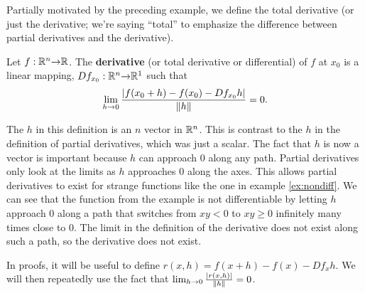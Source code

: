 Partially motivated by the preceding example, we define the
total derivative (or just the derivative; we're saying ``total'' to
emphasize the difference between partial derivatives and the
derivative).
\begin{definition}
  Let $f: \mathbb{R}^n {\rightarrow} \mathbb{R}$. The \textbf{derivative} (or total derivative
  or differential) of $f$ at $x_0$ is a  linear mapping, $Df_{x_0}:
  \mathbb{R}^n {\rightarrow} \mathbb{R}^1$ such that
  \begin{align*}
    \lim_{h {\rightarrow} 0} \frac{\left|f(x_0 + h) - f(x_0) - Df_{x_0} h\right|} {\left\Vert {h} \right\Vert}
    = 0.
  \end{align*}
\end{definition}
The $h$ in this definition is an $n$ vector in $\mathbb{R}^n$. This is
contrast to the $h$ in the definition of partial derivatives, which
was just a scalar. The fact that $h$ is now a vector is important
because $h$ can approach $0$ along any path. Partial derivatives only
look at the limits as $h$ approaches $0$ along the axes. This allows
partial derivatives to exist for strange functions like the one in
example \ref{ex:nondiff}. We can see that the function from the
example is not differentiable by letting $h$ approach $0$ along a path
that switches from $xy<0$ to $xy\geq 0$ infinitely many times close to
$0$. The limit in the definition of the derivative does not exist
along such a path, so the derivative does not exist. 
\begin{remark}
  In proofs, it will be useful to define $r(x,h) = f(x+h) - f(x) -
  Df_x h$. We will then repeatedly use the fact that $\lim_{h {\rightarrow} 0}
  \frac{|r(x,h)|}{\left\Vert {h} \right\Vert} = 0$.
\end{remark}

